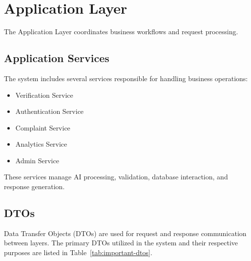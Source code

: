 \section{Application Layer}
\label{sec:application-layer}

The Application Layer coordinates business workflows and request processing.

\subsection{Application Services}

The system includes several services responsible for handling business operations:

\begin{itemize}
    \item Verification Service
    \item Authentication Service
    \item Complaint Service
    \item Analytics Service
    \item Admin Service
\end{itemize}

These services manage AI processing, validation, database interaction, and response generation.

\subsection{DTOs}

Data Transfer Objects (DTOs) are used for request and response communication between layers. The primary DTOs utilized in the system and their respective purposes are listed in Table~\ref{tab:important-dtos}.

